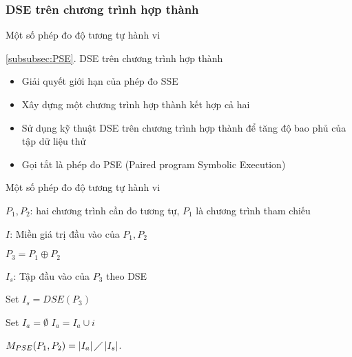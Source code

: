 \subsubsection*{DSE trên chương trình hợp thành}
\label{subsubsec:PSE}
\begin{frame}{Một số phép đo độ tương tự hành vi}
\begin{block}{\ref{subsubsec:PSE}. DSE trên chương trình hợp thành}
\begin{itemize}
	\item Giải quyết giới hạn của phép đo SSE
	\item Xây dựng một chương trình hợp thành kết hợp cả hai
	\item Sử dụng kỹ thuật DSE trên chương trình hợp thành 
	để tăng độ bao phủ của tập dữ liệu thử
	\item Gọi tắt là phép đo PSE (Paired
	program Symbolic Execution)
\end{itemize}
\end{block}
\end{frame}
\begin{frame}{Một số phép đo độ tương tự hành vi}
\begin{algorithm}[H]
	\caption{Thuật toán phép đo PSE}
	\begin{algorithmic}[1]
   \item $P_{1}, P_{2}$: hai chương trình cần đo tương tự, $P_1$ là
     chương trình tham chiếu
   \item $I$: Miền giá trị đầu vào của $P_{1}, P_{2}$
   \item $P_{3} = P_1 \oplus P_2$
   \item $I_{s}$: Tập đầu vào của $P_{3}$ theo DSE
   \item Set $I_{s} = DSE(P_{3})$ 
   \item Set $I_{a} = \emptyset$ 
     	\STATE $I_{a} = I_{a} \cup i$ 
     	\ENDIF 
     	\ENDFOR
   \item $M_{PSE}(P_{1}, P_{2}) = \left|I_{a}\right| \diagup
     \left|I_{s}\right| $.
   \end{algorithmic}
 \end{algorithm}
\end{frame}

